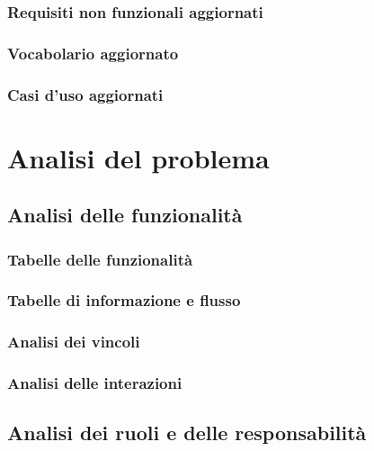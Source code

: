 \documentclass{article}
\begin{document}
\subsubsection{Requisiti non funzionali aggiornati}

\subsubsection{Vocabolario aggiornato}

\subsubsection{Casi d'uso aggiornati}



\pagebreak
\section{Analisi del problema}
\subsection{Analisi delle funzionalità}
\subsubsection{Tabelle delle funzionalità}

\subsubsection{Tabelle di informazione e flusso}

\subsubsection{Analisi dei vincoli}

\pagebreak
\subsubsection{Analisi delle interazioni}


\subsection{Analisi dei ruoli e delle responsabilità}
\end{document}

